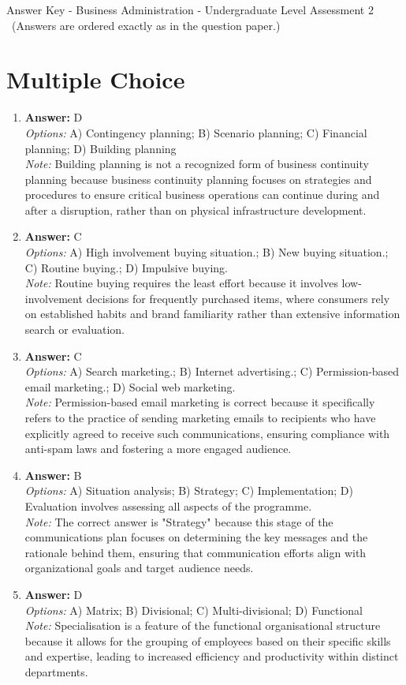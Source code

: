 \documentclass[12pt]{article}
\begin{document}
\begin{center}
Answer Key - Business Administration - Undergraduate Level Assessment 2 \
\small (Answers are ordered exactly as in the question paper.)
\end{center}

\section*{Multiple Choice}
\begin{enumerate}[label=\arabic*.]
\item \textbf{Answer:} D
\\ \textit{Options:} A) Contingency planning; B) Scenario planning; C) Financial planning; D) Building planning
\\ \textit{Note:} Building planning is not a recognized form of business continuity planning because business continuity planning focuses on strategies and procedures to ensure critical business operations can continue during and after a disruption, rather than on physical infrastructure development.
\item \textbf{Answer:} C
\\ \textit{Options:} A) High involvement buying situation.; B) New buying situation.; C) Routine buying.; D) Impulsive buying.
\\ \textit{Note:} Routine buying requires the least effort because it involves low-involvement decisions for frequently purchased items, where consumers rely on established habits and brand familiarity rather than extensive information search or evaluation.
\item \textbf{Answer:} C
\\ \textit{Options:} A) Search marketing.; B) Internet advertising.; C) Permission-based email marketing.; D) Social web marketing.
\\ \textit{Note:} Permission-based email marketing is correct because it specifically refers to the practice of sending marketing emails to recipients who have explicitly agreed to receive such communications, ensuring compliance with anti-spam laws and fostering a more engaged audience.
\item \textbf{Answer:} B
\\ \textit{Options:} A) Situation analysis; B) Strategy; C) Implementation; D) Evaluation involves assessing all aspects of the programme.
\\ \textit{Note:} The correct answer is "Strategy" because this stage of the communications plan focuses on determining the key messages and the rationale behind them, ensuring that communication efforts align with organizational goals and target audience needs.
\item \textbf{Answer:} D
\\ \textit{Options:} A) Matrix; B) Divisional; C) Multi-divisional; D) Functional
\\ \textit{Note:} Specialisation is a feature of the functional organisational structure because it allows for the grouping of employees based on their specific skills and expertise, leading to increased efficiency and productivity within distinct departments.
\end{enumerate}
\end{document}
